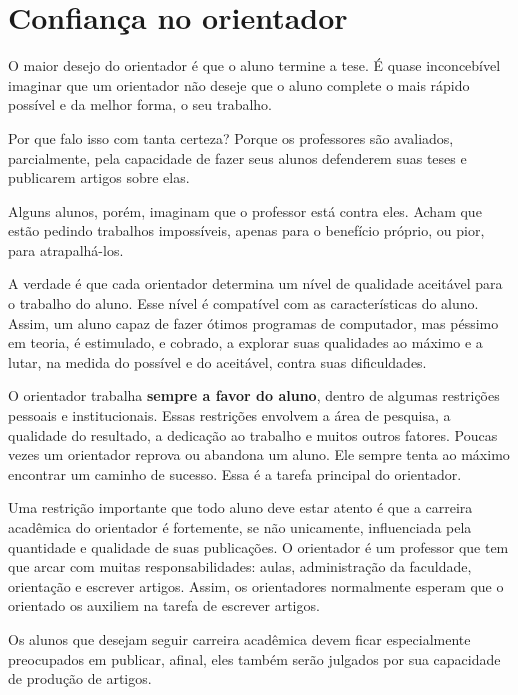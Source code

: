 \section{Confiança no orientador}


O maior desejo do orientador é que o aluno termine a tese. É quase inconcebível imaginar que um orientador não deseje que o aluno complete o mais rápido possível e da melhor forma, o seu trabalho. 

Por que falo isso com tanta certeza? Porque os professores são avaliados, parcialmente, pela capacidade de fazer seus alunos defenderem suas teses e publicarem artigos sobre elas.

Alguns alunos, porém, imaginam que o professor está contra eles. Acham que estão pedindo trabalhos impossíveis, apenas para o benefício próprio, ou pior, para atrapalhá-los.

A verdade é que cada orientador determina um nível de qualidade aceitável para o trabalho do aluno. Esse nível é compatível com as características do aluno. 
Assim, um aluno capaz de fazer ótimos programas de computador, mas péssimo em teoria, é estimulado, e cobrado, a explorar suas qualidades ao máximo e a lutar, na medida do possível e do aceitável, contra suas dificuldades.

O orientador trabalha \textbf{sempre a favor do aluno}, dentro de algumas restrições pessoais e institucionais. 
Essas restrições envolvem a área de pesquisa, a qualidade do resultado, a dedicação ao trabalho e muitos outros fatores. 
Poucas vezes um orientador reprova ou abandona um aluno.
 Ele sempre tenta ao máximo encontrar um caminho de sucesso. 
 Essa é a tarefa principal do orientador.

Uma restrição importante que todo aluno deve estar atento é que a carreira acadêmica do orientador é fortemente, se não unicamente, influenciada pela quantidade e qualidade de suas publicações. 
O orientador é um professor que tem que arcar com muitas responsabilidades: aulas, administração da faculdade, orientação e escrever artigos. 
Assim, os orientadores normalmente esperam que o orientado os auxiliem na tarefa de escrever artigos. 

Os alunos que desejam seguir carreira acadêmica devem ficar especialmente preocupados em publicar, afinal, eles também serão julgados por sua capacidade de produção de artigos.



